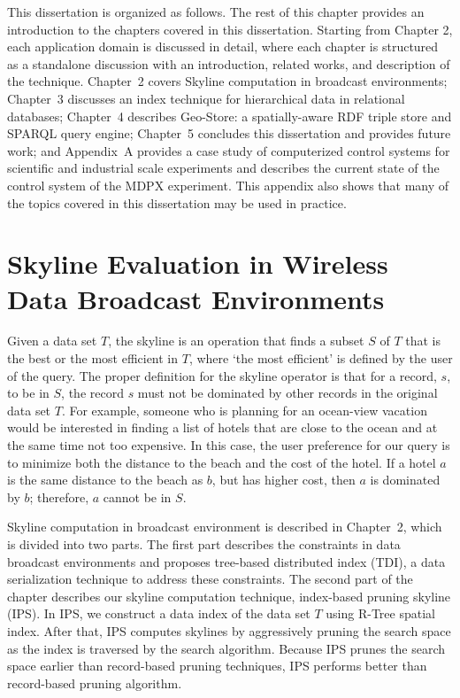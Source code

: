 This dissertation is organized as follows. The rest of this chapter provides an introduction to the chapters covered in this dissertation. Starting from Chapter 2, each application domain is discussed in detail, where each chapter is structured as a standalone discussion with an introduction, related works, and description of the technique. Chapter~2 covers Skyline computation in broadcast environments; Chapter~3 discusses an index technique for hierarchical data in relational databases; Chapter~4 describes Geo-Store: a spatially-aware RDF triple store and SPARQL query engine; Chapter~5 concludes this dissertation and provides future work; and Appendix~A provides a case study of computerized control systems for scientific and industrial scale experiments and describes the current state of the control system of the MDPX experiment. This appendix also shows that many of the topics covered in this dissertation may be used in practice.

\section{Skyline Evaluation in Wireless Data Broadcast Environments}

Given a data set $T$, the skyline is an operation that finds a subset $S$ of $T$ that is the best or the most efficient in $T$, where `the most efficient' is defined by the user of the query. The proper definition for the skyline operator is that for a record, $s$, to be in $S$, the record $s$ must not be dominated by other records in the original data set $T$\cite{shooting_stars, progressive_skyline}. For example, someone who is planning for an ocean-view vacation would be interested in finding a list of hotels that are close to the ocean and at the same time not too expensive. In this case, the user preference for our query is to minimize both the distance to the beach and the cost of the hotel. If a hotel $a$ is the same distance to the beach as $b$, but has higher cost, then $a$ is dominated by $b$; therefore, $a$ cannot be in $S$.

Skyline computation in broadcast environment is described in Chapter~2, which is divided into two parts. The first part describes the constraints in data broadcast environments and proposes tree-based distributed index (TDI), a data serialization technique to address these constraints. The second part of the chapter describes our skyline computation technique, index-based pruning skyline (IPS). In IPS, we construct a data index of the data set $T$ using R-Tree spatial index. After that, IPS computes skylines by aggressively pruning the search space as the index is traversed by the search algorithm. Because IPS prunes the search space earlier than record-based pruning techniques, IPS  performs better than record-based pruning algorithm.


